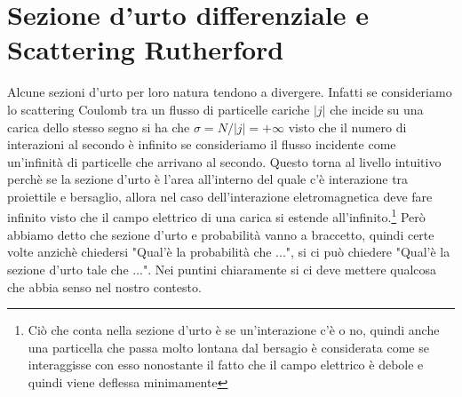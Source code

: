 \documentclass[11pt,a4paper]{article}
\begin{document}
	\section{Sezione d'urto differenziale e Scattering Rutherford}
		Alcune sezioni d'urto per loro natura tendono a divergere. Infatti se consideriamo lo scattering Coulomb tra un flusso di particelle cariche $|j|$ che incide su una carica dello stesso segno si ha che $\sigma=N/|j|=+\infty$ visto che il numero di interazioni al secondo è infinito se consideriamo il flusso incidente come un'infinità di particelle che arrivano al secondo.\newline
		Questo torna al livello intuitivo perchè se la sezione d'urto è l'area all'interno del quale c'è interazione tra proiettile e bersaglio, allora nel caso dell'interazione eletromagnetica deve fare infinito visto che il campo elettrico di una carica si estende all'infinito.\footnote{Ciò che conta nella sezione d'urto è se un'interazione c'è o no, quindi anche una particella che passa molto lontana dal bersagio è considerata come se interaggisse con esso nonostante il fatto che il campo elettrico è debole e quindi viene deflessa minimamente}\newline
		Però abbiamo detto che sezione d'urto e probabilità vanno a braccetto, quindi certe volte anzichè chiedersi "Qual'è la probabilità che ...", si ci può chiedere "Qual'è la sezione d'urto tale che ...". Nei puntini chiaramente si ci deve mettere qualcosa che abbia senso nel nostro contesto.\newline
\end{document}
